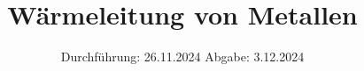 

\subject{V204}
\title{Wärmeleitung von Metallen}
\date{%
  Durchführung: 26.11.2024
  \hspace{3em}
  Abgabe: 3.12.2024
}



\maketitle
\thispagestyle{empty}
\tableofcontents
\newpage






\printbibliography{}


